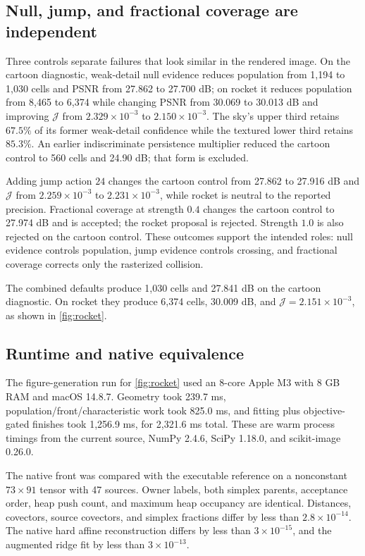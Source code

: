 \documentclass[11pt,letterpaper]{article}
\begin{document}
\subsection{Null, jump, and fractional coverage are independent}

Three controls separate failures that look similar in the rendered image. On the
cartoon diagnostic, weak-detail null evidence reduces population from 1,194 to 1,030
cells and PSNR from 27.862 to 27.700 dB; on rocket it reduces population from 8,465
to 6,374 while changing PSNR from 30.069 to 30.013 dB and improving
\(\mathcal J\) from \(2.329\times10^{-3}\) to \(2.150\times10^{-3}\). The sky's upper
third retains \(67.5\%\) of its former weak-detail confidence while the textured lower
third retains \(85.3\%\). An earlier indiscriminate persistence multiplier reduced the
cartoon control to 560 cells and 24.90 dB; that form is excluded.

Adding jump action \(24\) changes the cartoon control from 27.862 to 27.916 dB and
\(\mathcal J\) from \(2.259\times10^{-3}\) to \(2.231\times10^{-3}\), while rocket is
neutral to the reported precision. Fractional coverage at strength \(0.4\) changes the
cartoon control to 27.974 dB and is accepted; the rocket proposal is rejected. Strength
\(1.0\) is also rejected on the cartoon control. These outcomes support the intended
roles: null evidence controls population, jump evidence controls crossing, and
fractional coverage corrects only the rasterized collision.

The combined defaults produce 1,030 cells and 27.841 dB on the cartoon diagnostic. On
rocket they produce 6,374 cells, 30.009 dB, and
\(\mathcal J=2.151\times10^{-3}\), as shown in \cref{fig:rocket}.

\subsection{Runtime and native equivalence}

The figure-generation run for \cref{fig:rocket} used an 8-core Apple M3 with 8 GB RAM
and macOS 14.8.7. Geometry took 239.7 ms, population/front/characteristic work took
825.0 ms, and fitting plus objective-gated finishes took 1,256.9 ms, for 2,321.6 ms
total. These are warm process timings from the current source, NumPy 2.4.6, SciPy
1.18.0, and scikit-image 0.26.0.

The native front was compared with the executable reference on a nonconstant
\(73\times91\) tensor with 47 sources. Owner labels, both simplex parents, acceptance
order, heap push count, and maximum heap occupancy are identical. Distances,
covectors, source covectors, and simplex fractions differ by less than
\(2.8\times10^{-14}\). The native hard affine reconstruction differs by less than
\(3\times10^{-15}\), and the augmented ridge fit by less than \(3\times10^{-13}\).
\end{document}
